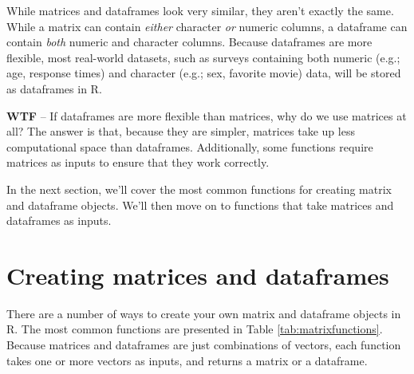 \documentclass[]{book}
\theoremstyle{definition}
\theoremstyle{definition}
\theoremstyle{remark}
\begin{document}
While matrices and dataframes look very similar, they aren't exactly the
same. While a matrix can contain \emph{either} character \emph{or}
numeric columns, a dataframe can contain \emph{both} numeric and
character columns. Because dataframes are more flexible, most real-world
datasets, such as surveys containing both numeric (e.g.; age, response
times) and character (e.g.; sex, favorite movie) data, will be stored as
dataframes in R.

\textbf{WTF} -- If dataframes are more flexible than matrices, why do we
use matrices at all? The answer is that, because they are simpler,
matrices take up less computational space than dataframes. Additionally,
some functions require matrices as inputs to ensure that they work
correctly.

In the next section, we'll cover the most common functions for creating
matrix and dataframe objects. We'll then move on to functions that take
matrices and dataframes as inputs.

\section{Creating matrices and
dataframes}\label{creating-matrices-and-dataframes}

There are a number of ways to create your own matrix and dataframe
objects in R. The most common functions are presented in Table
\ref{tab:matrixfunctions}. Because matrices and dataframes are just
combinations of vectors, each function takes one or more vectors as
inputs, and returns a matrix or a dataframe.
\end{document}
